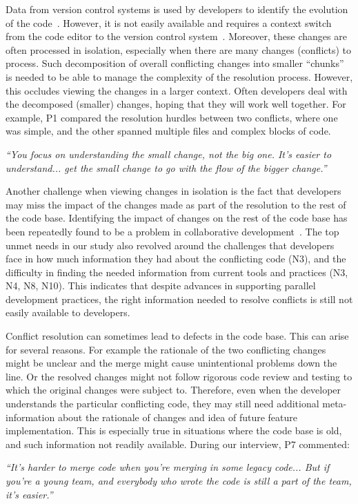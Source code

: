 Data from version control systems is used by developers to identify the evolution of the code~\cite{Mihai_lenses}.
However, it is not easily available and requires a context switch from the code editor to the version control system~\cite{Guzzi2015}. 
Moreover, these changes are often processed in isolation, especially when there are many changes (conflicts) to process. 
Such decomposition of overall conflicting changes into smaller ``chunks'' is needed to be able to manage the complexity of the resolution process.
However, this occludes viewing the changes in a larger context. 
Often developers deal with the decomposed (smaller) changes, hoping that they will work well together. 
For example, P1 compared the resolution hurdles between two conflicts, where one was simple, and the other spanned multiple files and complex blocks of code.
\begin{quoting}
\textit{``You focus on understanding the small change, not the big one. It's easier to understand... get the small change to go with the flow of the bigger change.''}
\end{quoting}

Another challenge when viewing changes in isolation is the fact that developers may miss the impact of the changes made as part of the resolution to the rest of the code base. 
Identifying the impact of changes on the rest of the code base has been repeatedly found to be a problem in collaborative development~\cite{deSouza2008, Guzzi2015}. 
The top unmet needs in our study also revolved around the challenges that developers face in how much information they had about the conflicting code (N3), and the difficulty in finding the needed information from current tools and practices (N3, N4, N8, N10). 
This indicates that despite advances in supporting parallel development practices, the right information needed to resolve conflicts is still not easily available to developers. 

Conflict resolution can sometimes lead to defects in the code base. 
This can arise for several reasons. 
For example the rationale of the two conflicting changes might be unclear and the merge might cause unintentional problems down the line. 
Or the resolved changes might not follow rigorous code review and testing to which the original changes were subject to.
Therefore, even when the developer understands the particular conflicting code, they may still need additional meta-information about the rationale of changes and idea of future feature implementation. 
This is especially true in situations where the code base is old, and such information not readily available. During our interview, P7 commented:
\begin{quoting}
\textit{``It's harder to merge code when you're merging in some legacy code... But if you're a young team, and everybody who wrote the code is still a part of the team, it's easier.''}
\end{quoting}

